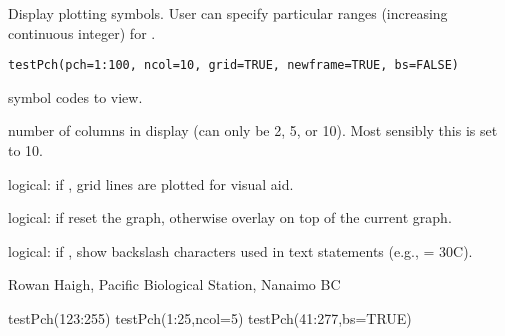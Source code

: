 \documentclass[letterpaper]{book}
\begin{document}
\begin{Description}\relax
Display plotting symbols. User can specify particular ranges (increasing 
continuous integer) for .
\end{Description}
\begin{Usage}
\begin{verbatim}
testPch(pch=1:100, ncol=10, grid=TRUE, newframe=TRUE, bs=FALSE)
\end{verbatim}
\end{Usage}
\begin{Arguments}
\begin{ldescription}
\item[\code{pch}] symbol codes to view.
\item[\code{ncol}] number of columns in display (can only be 2, 5, or 10). Most 
sensibly this is set to 10.
\item[\code{grid}] logical: if , grid lines are plotted for visual aid.
\item[\code{newframe}] logical: if  reset the graph, otherwise overlay 
on top of the current graph.
\item[\code{bs}] logical: if , show backslash characters used in text 
statements (e.g.,  = 30\eqn{^\circ}{}C).
\end{ldescription}
\end{Arguments}
\begin{Author}\relax
Rowan Haigh, Pacific Biological Station, Nanaimo BC
\end{Author}
\begin{Examples}
\begin{ExampleCode}
testPch(123:255)
testPch(1:25,ncol=5)
testPch(41:277,bs=TRUE)
\end{ExampleCode}
\end{Examples}
\end{document}
